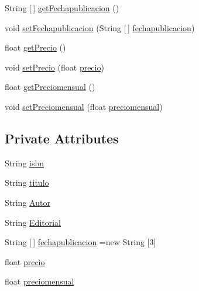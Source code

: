 \begin{DoxyCompactItemize}
\item 
String \mbox{[}$\,$\mbox{]} \mbox{\hyperlink{classlibreria_1_1_libro_a95dc4e4af6ec1bc331dfbc9f450332ef}{get\+Fechapublicacion}} ()
\item 
void \mbox{\hyperlink{classlibreria_1_1_libro_af7ef1b61c19ad0c9b9c37e84e16dd943}{set\+Fechapublicacion}} (String \mbox{[}$\,$\mbox{]} \mbox{\hyperlink{classlibreria_1_1_libro_a1feec01556c7a8ffe5963b544b7ebc58}{fechapublicacion}})
\item 
float \mbox{\hyperlink{classlibreria_1_1_libro_a2492008220692a6e4c9c929a666acdd7}{get\+Precio}} ()
\item 
void \mbox{\hyperlink{classlibreria_1_1_libro_a0263e8520885851783e3f46d150be0c5}{set\+Precio}} (float \mbox{\hyperlink{classlibreria_1_1_libro_ab19a3f31d2aaab1bca6ba4f188951adc}{precio}})
\item 
float \mbox{\hyperlink{classlibreria_1_1_libro_a4e96b191b19827c24320095b9a13ec1b}{get\+Preciomensual}} ()
\item 
void \mbox{\hyperlink{classlibreria_1_1_libro_acfd01d2c473e359ace0d642597d1b271}{set\+Preciomensual}} (float \mbox{\hyperlink{classlibreria_1_1_libro_aa3ecf9746a1de3547b71c154ffbcbeb7}{preciomensual}})
\end{DoxyCompactItemize}
\subsection*{Private Attributes}
\begin{DoxyCompactItemize}
\item 
String \mbox{\hyperlink{classlibreria_1_1_libro_a855939c41be35682aad6b6c08962dde3}{isbn}}
\item 
String \mbox{\hyperlink{classlibreria_1_1_libro_aa45a435366afb4759f59f6f4d86d0e3a}{titulo}}
\item 
String \mbox{\hyperlink{classlibreria_1_1_libro_aa5040773b6ae3f4b9538418a4499ba9c}{Autor}}
\item 
String \mbox{\hyperlink{classlibreria_1_1_libro_a0e45b510f79de7f6aaa678f4cf060b45}{Editorial}}
\item 
String \mbox{[}$\,$\mbox{]} \mbox{\hyperlink{classlibreria_1_1_libro_a1feec01556c7a8ffe5963b544b7ebc58}{fechapublicacion}} =new String \mbox{[}3\mbox{]}
\item 
float \mbox{\hyperlink{classlibreria_1_1_libro_ab19a3f31d2aaab1bca6ba4f188951adc}{precio}}
\item 
float \mbox{\hyperlink{classlibreria_1_1_libro_aa3ecf9746a1de3547b71c154ffbcbeb7}{preciomensual}}
\end{DoxyCompactItemize}


